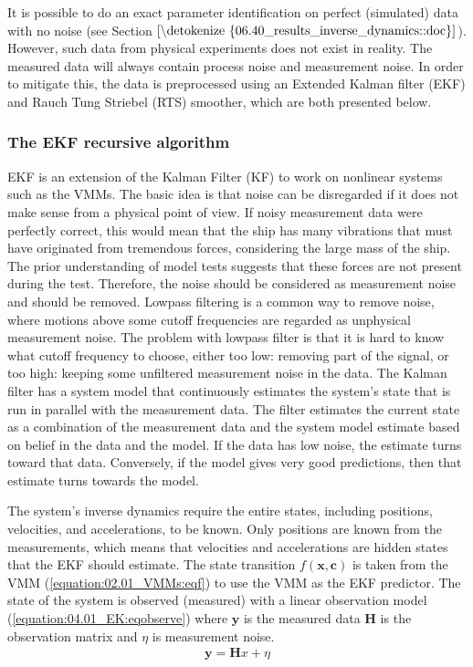 \documentclass[review]{elsarticle}
\begin{document}
It is possible to do an exact parameter identification on perfect (simulated) data with no noise (see Section \(\ref{\detokenize{06.40_results_inverse_dynamics::doc}}\)). However, such data from physical experiments does not exist in reality. The measured data will always contain process noise and measurement noise. In order to mitigate this, the data is preprocessed using an Extended Kalman filter (EKF) and Rauch Tung Striebel (RTS) smoother, which are both presented below.


\subsubsection{The EKF recursive algorithm}
\label{\detokenize{04.01_EK:the-ekf-recursive-algorithm}}

EKF is an extension of the Kalman Filter (KF) to work on nonlinear systems such as the VMMs. The basic idea is that noise can be disregarded if it does not make sense from a physical point of view. If noisy measurement data were perfectly correct, this would mean that the ship has many vibrations that must have originated from tremendous forces, considering the large mass of the ship. The prior understanding of model tests suggests that these forces are not present during the test. Therefore, the noise should be considered as measurement noise and should be removed. Low\sphinxhyphen{}pass filtering is a common way to remove noise, where motions above some cut\sphinxhyphen{}off frequencies are regarded as unphysical measurement noise. The problem with low\sphinxhyphen{}pass filter is that it is hard to know what cut\sphinxhyphen{}off frequency to choose, either too low: removing part of the signal, or too high: keeping some unfiltered measurement noise in the data. The Kalman filter has a system model that continuously estimates the system's state that is run in parallel with the measurement data. The filter estimates the current state as a combination of the measurement data and the system model estimate based on belief in the data and the model. If the data has low noise, the estimate turns toward that data. Conversely, if the model gives very good predictions, then that estimate turns towards the model.

  
The system's inverse dynamics require the entire states, including positions, velocities, and accelerations, to be known. Only positions are known from the measurements, which means that velocities and accelerations are hidden states that the EKF should estimate.
The state transition \(f(\mathbf{x},\mathbf{c})\) is taken from the VMM (\autoref{equation:02.01_VMMs:eqf}) to use the VMM as the EKF predictor.
The state of the system is observed (measured) with a linear observation model (\autoref{equation:04.01_EK:eqobserve}) where \(\mathbf{y}\) is the measured data \(\mathbf{H}\) is the observation matrix and \(\eta\) is measurement noise.
\begin{equation}\label{equation:04.01_EK:eqobserve}
\begin{split}\mathbf{y} = \mathbf{H} x + \eta\end{split}
\end{equation}
  
\end{document}
